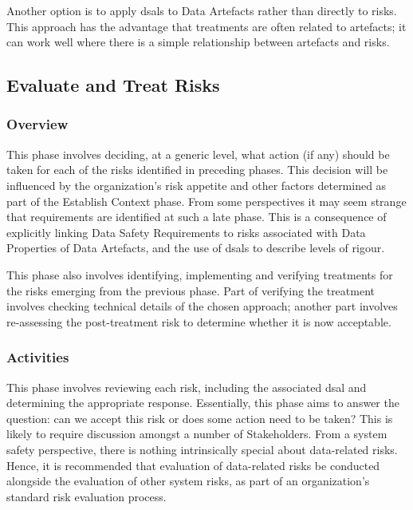 Another option is to apply \glspl{dsal} to Data Artefacts rather than directly to risks. This approach has the advantage that treatments are often related to artefacts; it can work well where there is a simple relationship between artefacts and risks.

\subsection{Evaluate and Treat Risks}
\subsubsection{Overview}
This phase involves deciding, at a generic level, what action (if any) should be taken for each of the risks identified in preceding phases. This decision will be influenced by the organization's risk appetite and other factors determined as part of the Establish Context phase. From some perspectives it may seem strange that requirements are identified at such a late phase. This is a consequence of explicitly linking Data Safety Requirements to risks associated with Data Properties of Data Artefacts, and the use of \glspl{dsal} to describe levels of rigour. 

This phase also involves identifying, implementing and verifying treatments for the risks emerging from the previous phase. Part of verifying the treatment involves checking technical details of the chosen approach; another part involves re-assessing the post-treatment risk to determine whether it is now acceptable.

\subsubsection{Activities}
This phase involves reviewing each risk, including the associated \gls{dsal} and determining the appropriate response. Essentially, this phase aims to answer the question: can we accept this risk or does some action need to be taken? This is likely to require discussion amongst a number of Stakeholders. From a system safety perspective, there is nothing intrinsically special about data-related risks. Hence, it is recommended that evaluation of data-related risks be conducted alongside the evaluation of other system risks, as part of an organization's standard risk evaluation process.

